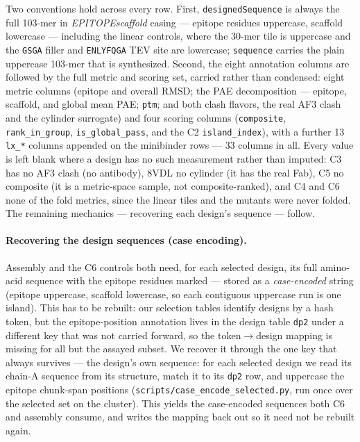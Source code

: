 Two conventions hold across every row. First, \texttt{designedSequence} is always the full 103-mer in
\emph{EPITOPEscaffold} casing --- epitope residues uppercase, scaffold lowercase --- including the
linear controls, where the 30-mer tile is uppercase and the \texttt{GSGA} filler and \texttt{ENLYFQGA}
TEV site are lowercase; \texttt{sequence} carries the plain uppercase 103-mer that is synthesized.
Second, the eight annotation columns are followed by the full metric and scoring set, carried rather than
condensed: eight metric columns (epitope and overall RMSD; the PAE decomposition --- epitope, scaffold,
and global mean PAE; \texttt{ptm}; and both clash flavors, the real AF3 clash and the cylinder surrogate)
and four scoring columns (\texttt{composite}, \texttt{rank\_in\_group}, \texttt{is\_global\_pass}, and the
C2 \texttt{island\_index}), with a further \num{13} \texttt{lx\_*} columns appended on the minibinder rows
--- \num{33} columns in all. Every value is left blank where a design has no such measurement rather than
imputed: C3 has no AF3 clash (no antibody), 8VDL no cylinder (it has the real Fab), C5 no composite (it is
a metric-space sample, not composite-ranked), and C4 and C6 none of the fold metrics, since the linear
tiles and the mutants were never folded. The remaining mechanics --- recovering each design's sequence
--- follow.

\paragraph{Recovering the design sequences (case encoding).} Assembly and the C6 controls both need,
for each selected design, its full amino-acid sequence with the epitope residues marked --- stored as
a \emph{case-encoded} string (epitope uppercase, scaffold lowercase, so each contiguous uppercase run
is one island). This has to be rebuilt: our selection tables identify designs by a hash token, but the
epitope-position annotation lives in the design table \texttt{dp2} under a different key that was not
carried forward, so the token$\to$design mapping is missing for all but the assayed subset. We recover
it through the one key that always survives --- the design's own sequence: for each selected design we
read its chain-A sequence from its structure, match it to its \texttt{dp2} row, and uppercase the
epitope chunk-span positions (\texttt{scripts/case\_encode\_selected.py}, run once over the selected
set on the cluster). This yields the case-encoded sequences both C6 and assembly consume, and writes
the mapping back out so it need not be rebuilt again.

